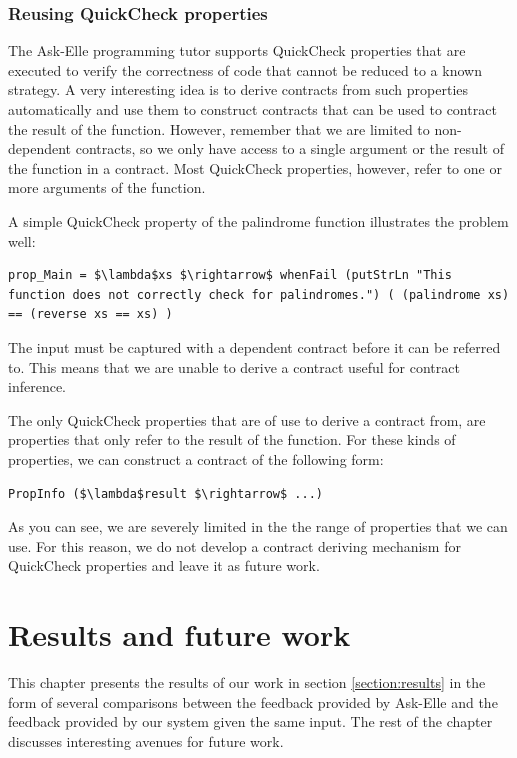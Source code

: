 \documentclass[10pt]{report}
\newcommand{\code}[1]{%
  {%
   \setlength{\fboxsep}{-2\fboxrule}%
   \fcolorbox{black}{light-gray}{\hspace{1.5pt}\strut\texttt{#1}\hspace{1.5pt}}%
  }%
}
\begin{document}
{\subsection{Reusing QuickCheck properties}
\label{subsection:reusing-qc-props}

The Ask-Elle programming tutor supports QuickCheck properties that are executed to verify the correctness of code that cannot be reduced to a known strategy.
A very interesting idea is to derive contracts from such properties automatically and use them to construct contracts that can be used to contract the result of the function.
However, remember that we are limited to non-dependent contracts, so we only have access to a single argument or the result of the function in a contract.
Most QuickCheck properties, however, refer to one or more arguments of the function.

A simple QuickCheck property of the palindrome function illustrates the problem well:

\begin{lstlisting}[mathescape]
prop_Main = $\lambda$xs $\rightarrow$ whenFail (putStrLn "This function does not correctly check for palindromes.") ( (palindrome xs) == (reverse xs == xs) )  
\end{lstlisting}

The input \code{xs} must be captured with a dependent contract before it can be referred to.
This means that we are unable to derive a contract useful for contract inference.

The only QuickCheck properties that are of use to derive a contract from, are properties that only refer to the result of the function.
For these kinds of properties, we can construct a contract of the following form:

\begin{lstlisting}[mathescape]
PropInfo ($\lambda$result $\rightarrow$ ...)
\end{lstlisting}

As you can see, we are severely limited in the the range of properties that we can use.
For this reason, we do not develop a contract deriving mechanism for QuickCheck properties and leave it as future work.

\chapter{Results and future work}
\label{futurework}

This chapter presents the results of our work in section \ref{section:results} in the form of several comparisons between the feedback provided by Ask-Elle and the feedback provided by our system given the same input.
The rest of the chapter discusses interesting avenues for future work.

}
\end{document}
